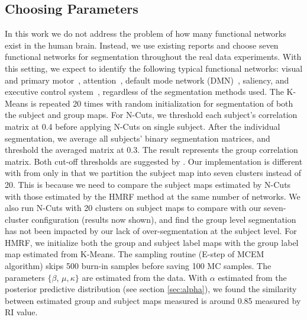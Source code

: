 \documentclass[review,authoryear]{elsarticle}
\begin{document}
\subsection{Choosing Parameters}
In this work we do not address the problem of how many functional networks exist
in the human brain. Instead, we use existing reports \citep{yeo2011organization}
and choose seven functional networks for segmentation throughout the real data
experiments. With this setting, we expect to identify the following typical
functional networks: visual and primary motor~\citep{damoiseaux2006consistent},
attention~\citep{fox2006spontaneous}, default mode network
(DMN)~\citep{greicius2004default}, saliency, and executive control
system~\citep{seeley2007dissociable}, regardless of the segmentation methods
used.  The K-Means is repeated 20 times with random initialization
\citep{arthur2007k} for segmentation of both the subject and group maps. For
N-Cuts, we threshold each subject's correlation matrix at 0.4 before applying
N-Cuts on single subject. After the individual segmentation, we average all
subjects' binary segmentation matrices, and threshold the averaged matrix at
0.3. The result represents the group correlation matrix. Both cut-off thresholds
are suggested by \citet{van2008normalized}. Our implementation is different with
from \citeauthor{van2008normalized} only in that we partition the subject map
into seven clusters instead of 20. This is because we need to compare the
subject maps estimated by N-Cuts with those estimated by the HMRF method at the
same number of networks. We also run N-Cuts with 20 clusters on subject maps to
compare with our seven-cluster configuration (results now shown), and find the
group level segmentation has not been impacted by our lack of over-segmentation
at the subject level. For HMRF, we initialize both the group and subject label
maps with the group label map estimated from K-Means. The sampling routine
(E-step of MCEM algorithm) skips 500 burn-in samples before saving 100 MC
samples. The parameters $\{\beta$, $\mu, \kappa\}$ are estimated from the
data. With $\alpha$ estimated from the posterior predictive distribution (see
section \ref{sec:alpha}), we found the similarity between estimated group and
subject maps measured is around 0.85 measured by RI value.
\end{document}
